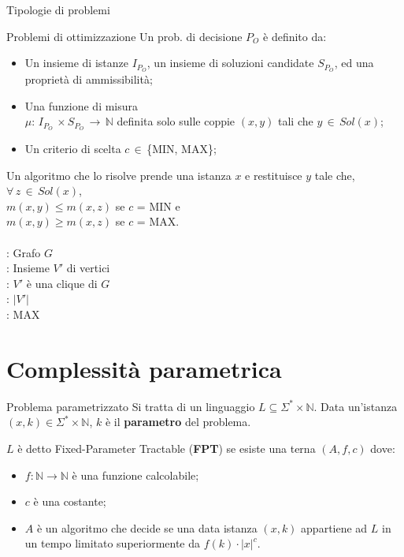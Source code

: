 \documentclass[10pt,a4paper]{article}
\begin{document}
\begin{multicols}{3}
\begin{textbox}{Tipologie di problemi}
\begin{textbox}{Problemi di ottimizzazione}
Un prob. di decisione \(P_O\) è definito da:
\begin{itemize}[leftmargin=*]
    \item Un insieme di istanze \(I_{P_O}\), un insieme di soluzioni candidate  \(S_{P_O}\), ed una proprietà di ammissibilità;
    \item Una funzione di misura \\\(\mu:\,I_{P_O}\,\times S_{P_O}\,\rightarrow\,\mathbb{N} \)
    definita solo sulle coppie \((x,y)\) tali che \(y\,\in\,Sol(x)\);
    \item Un criterio di scelta \(c\,\in\,\)\{MIN, MAX\};
\end{itemize}
Un algoritmo che lo risolve prende
una istanza \(x\) e restituisce \(y\) tale
che,\\ \(\forall\,z\,\in\,Sol(x)\), \\
\(m(x,y) \leq m(x,z)\) se \(c\) = MIN e \\
\(m(x,y) \geq m(x,z)\) se \(c\) = MAX.\\
\\
: Grafo \(G\)\\
: Insieme \(V'\) di vertici \\
: \(V'\) è una clique di \(G\)\\
: \(|V'|\) \\
: MAX
\end{textbox}

\end{textbox}




\section{Complessità parametrica}

\begin{textbox}{Problema parametrizzato}
Si tratta di un linguaggio \(L \subseteq \Sigma^\ast \times \mathbb{N}\).
Data un’istanza \((x,k) \in \Sigma^\ast \times \mathbb{N}\), \(k\) è
il \textbf{parametro} del problema.

\(L\) è detto Fixed-Parameter Tractable (\textbf{FPT}) se esiste una terna \((A,f,c)\) dove:
\begin{itemize}[leftmargin=*]
    \item \(f:\mathbb{N} \rightarrow \mathbb{N}\) è una funzione calcolabile;
    \item \(c\) è una costante;
    \item \(A\) è un algoritmo che decide se una data istanza \((x,k)\) appartiene ad \(L\) in un tempo limitato superiormente da \(f(k)\cdot|x|^c\).
\end{itemize}


\end{textbox}
\end{multicols}
\end{document}
